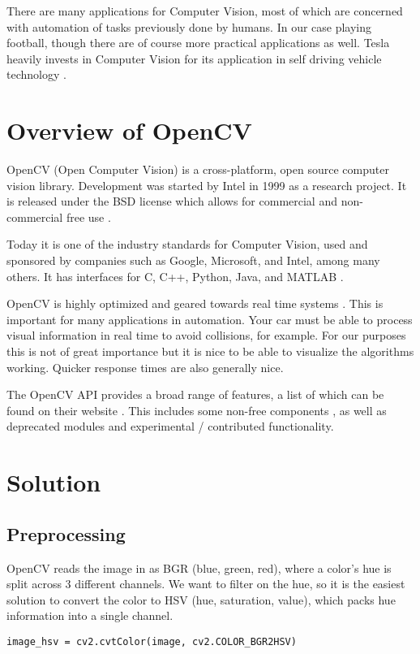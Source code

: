 \documentclass[12pt, a4paper]{article}
\begin{document}
There are many applications for Computer Vision, most of which are concerned with automation of tasks previously done by humans. In our case playing football, though there are of course more practical applications as well.
Tesla heavily invests in Computer Vision for its application in self driving vehicle technology \cite{teslaAutopilot} \cite{teslaCVArticle}.

\section{Overview of OpenCV}
OpenCV (Open Computer Vision) is a cross-platform, open source computer vision library. Development was started by Intel in 1999 as a research project. It is released under the BSD license which allows for commercial and non-commercial free use \cite{learningOpenCV}.

Today it is one of the industry standards for Computer Vision, used and sponsored by companies such as Google, Microsoft, and Intel, among many others. It has interfaces for C, C++, Python, Java, and MATLAB \cite{aboutOpenCV}.

OpenCV is highly optimized and geared towards real time systems \cite{aboutOpenCV}. This is important for many applications in automation. Your car must be able to process visual information in real time to avoid collisions, for example.
For our purposes this is not of great importance but it is nice to be able to visualize the algorithms working. Quicker response times are also generally nice.

The OpenCV API provides a broad range of features, a list of which can be found on their website \cite{openCVRefMan}. This includes some non-free components \cite{openCVNonFree}, as well as deprecated modules and experimental / contributed functionality.

\section{Solution}
\subsection{Preprocessing}
OpenCV reads the image in as BGR (blue, green, red), where a color's hue is split across 3 different channels. We want to filter on the hue, so it is the easiest solution to convert the color to HSV (hue, saturation, value), which packs hue information into a single channel.

\begin{lstlisting}
image_hsv = cv2.cvtColor(image, cv2.COLOR_BGR2HSV)
\end{lstlisting}
\end{document}
